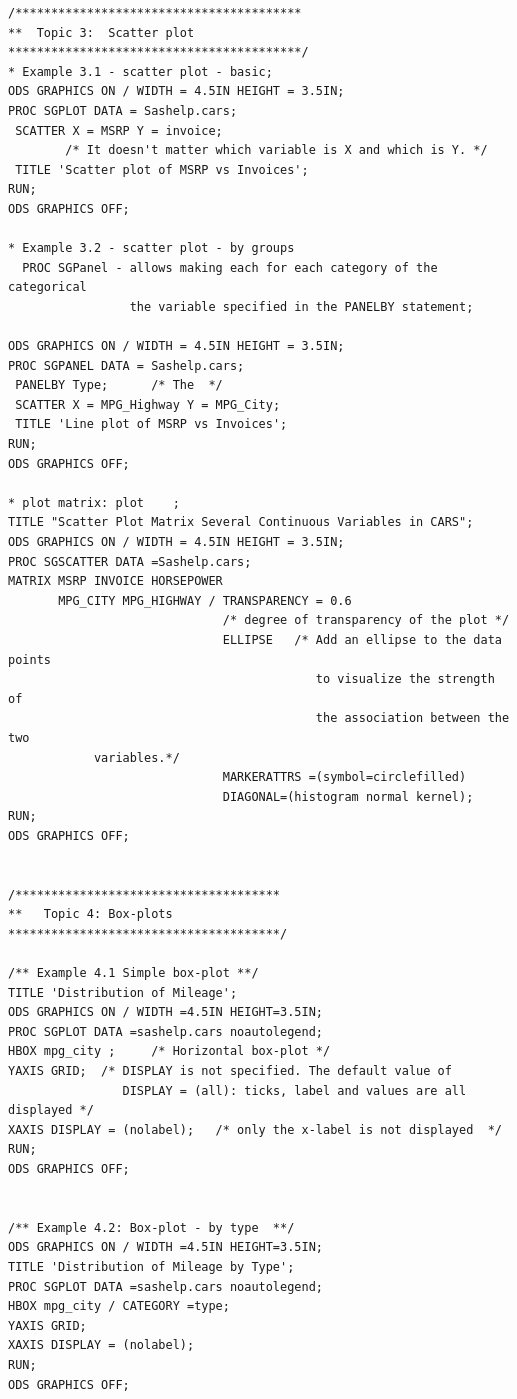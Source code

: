 \documentclass[
]{book}
\begin{document}
\begin{verbatim}
/****************************************
**  Topic 3:  Scatter plot 
*****************************************/
* Example 3.1 - scatter plot - basic;
ODS GRAPHICS ON / WIDTH = 4.5IN HEIGHT = 3.5IN;
PROC SGPLOT DATA = Sashelp.cars;
 SCATTER X = MSRP Y = invoice;  
        /* It doesn't matter which variable is X and which is Y. */
 TITLE 'Scatter plot of MSRP vs Invoices';
RUN; 
ODS GRAPHICS OFF;

* Example 3.2 - scatter plot - by groups
  PROC SGPanel - allows making each for each category of the categorical 
                 the variable specified in the PANELBY statement;

ODS GRAPHICS ON / WIDTH = 4.5IN HEIGHT = 3.5IN;
PROC SGPANEL DATA = Sashelp.cars;
 PANELBY Type;      /* The  */
 SCATTER X = MPG_Highway Y = MPG_City;
 TITLE 'Line plot of MSRP vs Invoices';
RUN; 
ODS GRAPHICS OFF;

* plot matrix: plot    ;
TITLE "Scatter Plot Matrix Several Continuous Variables in CARS";
ODS GRAPHICS ON / WIDTH = 4.5IN HEIGHT = 3.5IN;
PROC SGSCATTER DATA =Sashelp.cars;
MATRIX MSRP INVOICE HORSEPOWER 
       MPG_CITY MPG_HIGHWAY / TRANSPARENCY = 0.6  
                              /* degree of transparency of the plot */
                              ELLIPSE   /* Add an ellipse to the data points 
                                           to visualize the strength of 
                                           the association between the two
            variables.*/
                              MARKERATTRS =(symbol=circlefilled)
                              DIAGONAL=(histogram normal kernel);
RUN;
ODS GRAPHICS OFF;


/*************************************
**   Topic 4: Box-plots
**************************************/

/** Example 4.1 Simple box-plot **/
TITLE 'Distribution of Mileage';
ODS GRAPHICS ON / WIDTH =4.5IN HEIGHT=3.5IN;
PROC SGPLOT DATA =sashelp.cars noautolegend;
HBOX mpg_city ;     /* Horizontal box-plot */
YAXIS GRID;  /* DISPLAY is not specified. The default value of 
                DISPLAY = (all): ticks, label and values are all displayed */
XAXIS DISPLAY = (nolabel);   /* only the x-label is not displayed  */
RUN;
ODS GRAPHICS OFF;


/** Example 4.2: Box-plot - by type  **/
ODS GRAPHICS ON / WIDTH =4.5IN HEIGHT=3.5IN;
TITLE 'Distribution of Mileage by Type';
PROC SGPLOT DATA =sashelp.cars noautolegend;
HBOX mpg_city / CATEGORY =type;
YAXIS GRID; 
XAXIS DISPLAY = (nolabel);
RUN;
ODS GRAPHICS OFF;


\end{verbatim}
\end{document}
